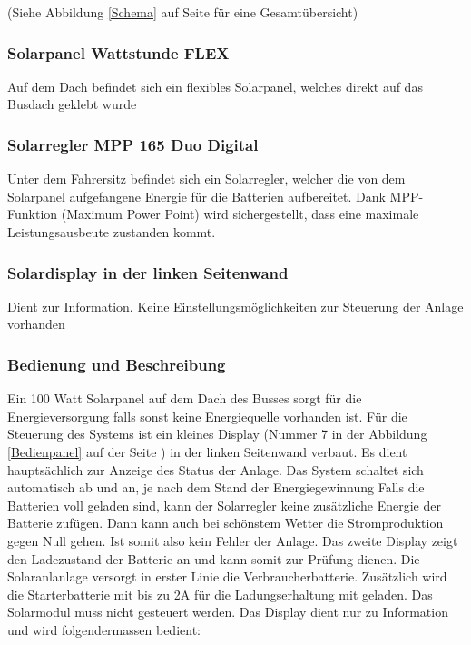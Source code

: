(Siehe Abbildung \ref{Schema} auf Seite \pageref{Schema} für eine Gesamtübersicht)

\subsubsection{Solarpanel Wattstunde FLEX}
Auf dem Dach befindet sich ein flexibles Solarpanel, welches direkt auf das Busdach geklebt wurde

\subsubsection{Solarregler MPP 165 Duo Digital}
Unter dem Fahrersitz befindet sich ein Solarregler, welcher die von dem Solarpanel aufgefangene Energie für die Batterien aufbereitet.
Dank MPP-Funktion (Maximum Power Point) wird sichergestellt, dass eine maximale Leistungsausbeute zustanden kommt.

\subsubsection{Solardisplay in der linken Seitenwand}
Dient zur Information.
Keine Einstellungsmöglichkeiten zur Steuerung der Anlage vorhanden

\subsubsection{Bedienung und Beschreibung}
Ein 100 Watt Solarpanel auf dem Dach des Busses sorgt für die Energieversorgung falls sonst keine Energiequelle vorhanden ist. 
Für die Steuerung des Systems ist ein kleines Display (Nummer 7 in der Abbildung \ref{Bedienpanel} auf der Seite \pageref{Bedienpanel}) in der linken Seitenwand verbaut.
Es dient hauptsächlich zur Anzeige des Status der Anlage.
Das System schaltet sich automatisch ab und an, je nach dem Stand der Energiegewinnung
Falls die Batterien voll geladen sind, kann der Solarregler keine zusätzliche Energie der Batterie zufügen.
Dann kann auch bei schönstem Wetter die Stromproduktion gegen Null gehen.
Ist somit also kein Fehler der Anlage.
Das zweite Display zeigt den Ladezustand der Batterie an und kann somit zur Prüfung dienen.
Die Solaranlanlage versorgt in erster Linie die Verbraucherbatterie.
Zusätzlich wird die Starterbatterie mit bis zu 2A für die Ladungserhaltung mit geladen.
Das Solarmodul muss nicht gesteuert werden.
Das Display dient nur zu Information und wird folgendermassen bedient:

